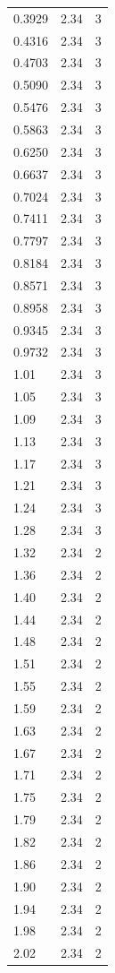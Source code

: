 \begin{longtable}{lrr}
  0.3929 & 2.34 & 3 \\
  0.4316 & 2.34 & 3 \\
  0.4703 & 2.34 & 3 \\
  0.5090 & 2.34 & 3 \\
  0.5476 & 2.34 & 3 \\
  0.5863 & 2.34 & 3 \\
  0.6250 & 2.34 & 3 \\
  0.6637 & 2.34 & 3 \\
  0.7024 & 2.34 & 3 \\
  0.7411 & 2.34 & 3 \\
  0.7797 & 2.34 & 3 \\
  0.8184 & 2.34 & 3 \\
  0.8571 & 2.34 & 3 \\
  0.8958 & 2.34 & 3 \\
  0.9345 & 2.34 & 3 \\
  0.9732 & 2.34 & 3 \\
  1.01 & 2.34 & 3 \\
  1.05 & 2.34 & 3 \\
  1.09 & 2.34 & 3 \\
  1.13 & 2.34 & 3 \\
  1.17 & 2.34 & 3 \\
  1.21 & 2.34 & 3 \\
  1.24 & 2.34 & 3 \\
  1.28 & 2.34 & 3 \\
  1.32 & 2.34 & 2 \\
  1.36 & 2.34 & 2 \\
  1.40 & 2.34 & 2 \\
  1.44 & 2.34 & 2 \\
  1.48 & 2.34 & 2 \\
  1.51 & 2.34 & 2 \\
  1.55 & 2.34 & 2 \\
  1.59 & 2.34 & 2 \\
  1.63 & 2.34 & 2 \\
  1.67 & 2.34 & 2 \\
  1.71 & 2.34 & 2 \\
  1.75 & 2.34 & 2 \\
  1.79 & 2.34 & 2 \\
  1.82 & 2.34 & 2 \\
  1.86 & 2.34 & 2 \\
  1.90 & 2.34 & 2 \\
  1.94 & 2.34 & 2 \\
  1.98 & 2.34 & 2 \\
  2.02 & 2.34 & 2 \\

\end{longtable}
